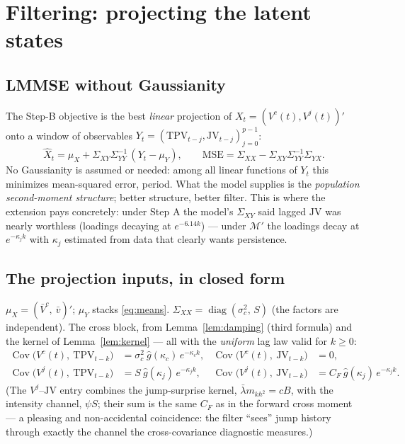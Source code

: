 \documentclass[11pt]{report}
\theoremstyle{definition}
\theoremstyle{remark}
\newcommand{\Cov}{\operatorname{Cov}}
\newcommand{\Vc}{V^{c}}
\newcommand{\Vj}{V^{j}}
\newcommand{\TPV}{\mathrm{TPV}}
\newcommand{\JV}{\mathrm{JV}}
\newcommand{\mkh}{m_{kh^{2}}}
\begin{document}
\chapter{Filtering: projecting the latent states}
\label{ch:filter}

\section{LMMSE without Gaussianity}

The Step-B objective is the best \emph{linear} projection of
$X_{t}=(\Vc(t),\Vj(t))'$ onto a window of observables
$Y_{t}=(\TPV_{t-j},\JV_{t-j})_{j=0}^{p-1}$:
\[
\hat X_{t}=\mu_{X}+\Sigma_{XY}\Sigma_{YY}^{-1}\,(Y_{t}-\mu_{Y}),
\qquad
\text{MSE}=\Sigma_{XX}-\Sigma_{XY}\Sigma_{YY}^{-1}\Sigma_{YX}.
\]
No Gaussianity is assumed or needed: among all linear functions of $Y_t$
this minimizes mean-squared error, period. What the model supplies is the
\emph{population second-moment structure}; better structure, better filter.
This is where the extension pays concretely: under Step A the model's
$\Sigma_{XY}$ said lagged $\JV$ was nearly worthless (loadings decaying at
$e^{-6.14k}$) --- under $\mathcal{M}'$ the loadings decay at
$e^{-\kappa_{j}k}$ with $\kappa_{j}$ estimated from data that clearly wants
persistence.

\section{The projection inputs, in closed form}

$\mu_{X}=(\bar V^{c},\ \bar v)'$; $\mu_{Y}$ stacks
\eqref{eq:means}. $\Sigma_{XX}=\operatorname{diag}(\sigma_{c}^{2},\,S)$
(the factors are independent). The cross block, from
Lemma~\ref{lem:damping} (third formula) and the kernel of
Lemma~\ref{lem:kernel} --- all with the \emph{uniform} lag law valid for
$k\ge0$:
\begin{equation}\label{eq:sigmaxy}
\boxed{
\begin{aligned}
\Cov\big(\Vc(t),\ \TPV_{t-k}\big)&=\sigma_{c}^{2}\ \hat g(\kappa_{c})\,e^{-\kappa_{c}k},
&\Cov\big(\Vc(t),\ \JV_{t-k}\big)&=0,\\
\Cov\big(\Vj(t),\ \TPV_{t-k}\big)&=S\ \hat g(\kappa_{j})\,e^{-\kappa_{j}k},
&\Cov\big(\Vj(t),\ \JV_{t-k}\big)&=C_{F}\ \hat g(\kappa_{j})\,e^{-\kappa_{j}k}.
\end{aligned}}
\end{equation}
(The $\Vj$--$\JV$ entry combines the jump-surprise kernel,
$\bar\lambda\mkh=cB$, with the intensity channel, $\psi S$; their sum is the
same $C_{F}$ as in the forward cross moment --- a pleasing and non-accidental
coincidence: the filter ``sees'' jump history through exactly the channel the
cross-covariance diagnostic measures.)
\end{document}
